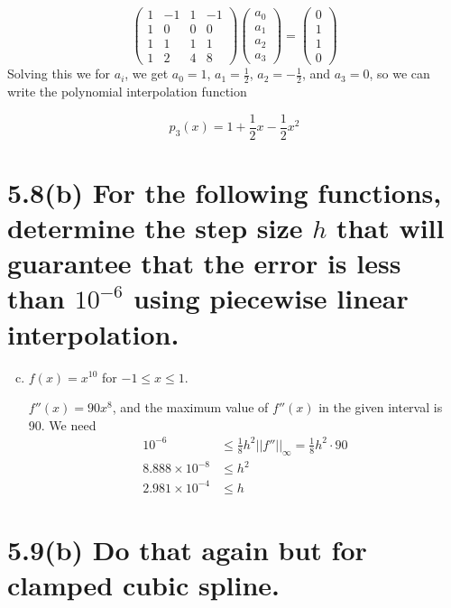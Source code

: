 \documentclass{article}
\begin{document}
\begin{enumerate}[(a)]
  $$
  \begin{pmatrix}
    1 & -1 & 1 & -1 \\ 1 & 0 & 0 & 0 \\ 1 & 1 & 1 & 1 \\ 1 & 2 & 4 & 8 
  \end{pmatrix}
    \begin{pmatrix}
      a_0 \\ a_1 \\ a_2 \\ a_3
    \end{pmatrix}
    =
    \begin{pmatrix}
      0 \\ 1 \\ 1 \\ 0
    \end{pmatrix}
  $$
    Solving this we for $a_i$, we get $a_0 = 1$, $a_1 = \frac{1}{2}$, $a_2 = -\frac{1}{2}$, and $a_3 = 0$, so we can write the polynomial interpolation function

    $$p_3(x) = 1 + \frac{1}{2}x - \frac{1}{2}x^2$$

\end{enumerate}

\section*{5.8(b) \normalsize For the following functions, determine the step size $h$ that will guarantee that the error is less than $10^{-6}$ using piecewise linear interpolation.}

\begin{enumerate}[(a)]\setcounter{enumi}{2}
  \item $f(x) = x^{10}$ for $-1 \leq x \leq 1$.

    $f''(x) = 90x^8$, and the maximum value of $f''(x)$ in the given interval is 90. We need
    \begin{align*}
      10^{-6} &\leq \frac{1}{8}h^2||f''||_{\infty} = \frac{1}{8}h^2\cdot 90 \\
      8.888 \times 10^{-8} &\leq h^2 \\
      2.981 \times 10^{-4} &\leq h
    \end{align*}

\end{enumerate}

\section*{5.9(b) \normalsize Do that again but for clamped cubic spline.}
\end{document}
